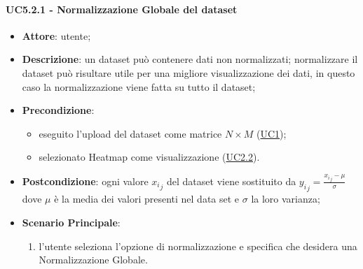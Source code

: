     \paragraph{UC5.2.1 - Normalizzazione Globale del dataset}
    \label{uc5.2.1}
    \begin{itemize}
    \item \textbf{Attore}: utente;
    \item \textbf{Descrizione}: un dataset può contenere dati non normalizzati; normalizzare il dataset può risultare utile per una migliore visualizzazione dei dati, in questo caso la normalizzazione viene fatta su tutto il dataset;
    \item \textbf{Precondizione}: 
    \begin{itemize}
        \item eseguito l'upload del dataset come matrice $N\times M$ (\hyperref[uc1]{UC1});
        \item selezionato Heatmap come visualizzazione (\hyperref[uc2.2]{UC2.2}).
    \end{itemize}  
    \item \textbf{Postcondizione}:  ogni valore ${x_i}_j$ del dataset viene sostituito da $ {y_i}_j = \frac{{x_i}_j - \mu}{\sigma}$ dove $\mu$ è la media dei valori presenti nel data set e $\sigma$ la loro varianza;
    \item \textbf{Scenario Principale}: 
    \begin{enumerate}
        \item l'utente seleziona l'opzione di normalizzazione e specifica che desidera una Normalizzazione Globale.
    \end{enumerate}  
    \end{itemize}
    
